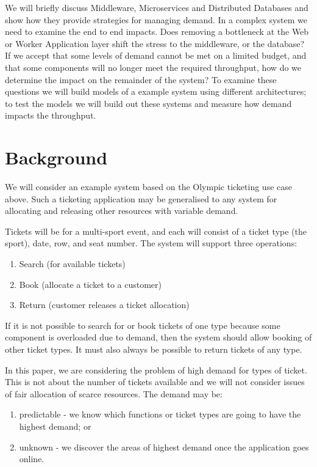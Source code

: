 \documentclass{llncs}
\begin{document}
We will briefly discuss Middleware, Microservices and Distributed Databases and show how they provide strategies for managing demand.  In a complex system we need to examine the end to end impacts.  Does removing a bottleneck at the Web or Worker Application layer shift the stress to the middleware, or the database?  If we accept that some levels of demand cannot be met on a limited budget, and that some components will no longer meet the required throughput, how do we determine the impact on the remainder of the system?  To examine these questions we will build models of a example system using different architectures; to test the models we will build out these systems and measure how demand impacts the throughput.

%
%

\section{Background}

We will consider an example system based on the Olympic ticketing use case above.  Such a ticketing application may be generalised to any system for allocating and releasing other resources with variable demand.

Tickets will be for a multi-sport event, and each will consist of a ticket type (the sport), date, row, and seat number.  The system will support three operations:
\begin{enumerate}
\item Search (for available tickets)
\item Book (allocate a ticket to a customer)
\item Return (customer releases a ticket allocation)
\end{enumerate}

If it is not possible to search for or book tickets of one type because some component is overloaded due to demand, then the system should allow booking of other ticket types.  It must also always be possible to return tickets of any type.

In this paper, we are considering the problem of high demand for types of ticket.  This is not about the number of tickets available and we will not consider issues of fair allocation of scarce resources.  The demand may be:
\begin{enumerate}
\item predictable - we know which functions or ticket types are going to have the highest demand; or
\item unknown - we discover the areas of highest demand once the application goes online.
\end{enumerate}
\end{document}
